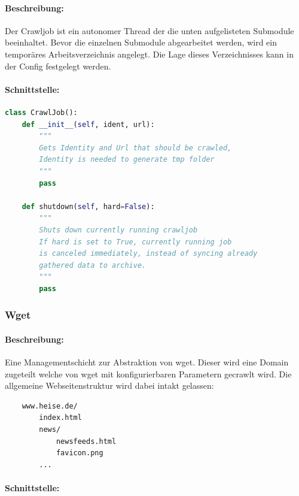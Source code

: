 
\paragraph{Beschreibung:}
\label{par:beschreibung_}
Der Crawljob ist ein autonomer Thread der die unten aufgelisteten Submodule beeinhaltet.
Bevor die einzelnen Submodule abgearbeitet werden, wird ein temporäres Arbeitsverzeichnis angelegt.
Die Lage dieses Verzeichnisses kann in der Config festgelegt werden.
\paragraph{Schnittstelle:}
\label{par:api_}

\begin{lstlisting}[language=python]
class CrawlJob():
    def __init__(self, ident, url):
        """
        Gets Identity and Url that should be crawled,
        Identity is needed to generate tmp folder
        """
        pass

    def shutdown(self, hard=False): 
        """
        Shuts down currently running crawljob
        If hard is set to True, currently running job
        is canceled immediately, instead of syncing already
        gathered data to archive.
        """
        pass
\end{lstlisting}

\subsubsection{Wget}
\label{ssub:wget}
\paragraph{Beschreibung:}
\label{par:beschreibung_}
Eine Managementschicht zur Abstraktion von wget.
Dieser wird eine Domain zugeteilt welche von wget mit konfigurierbaren Parametern gecrawlt wird.
Die allgemeine Webseitenstruktur wird dabei intakt gelassen:

\begin{verbatim}
    www.heise.de/
        index.html
        news/
            newsfeeds.html
            favicon.png
        ...
\end{verbatim}

\paragraph{Schnittstelle:}
\label{par:schnittstelle_}

